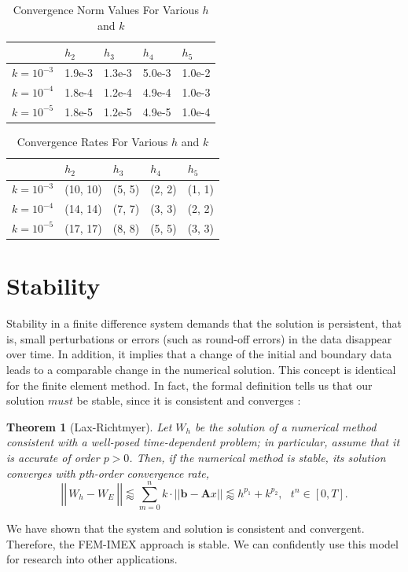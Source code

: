 \documentclass[12pt]{article}
\newtheorem{theorem}{Theorem}
\begin{document}
\begin{table}[H]
	\caption{Convergence Norm Values For Various $h$ and $k$}\label{tab:converg_norms}
	\centering
	\begin{tabular}{|l|l|l|l|l|}
		\hline
					& $h_2$  & $h_3$  & $h_4$  & $h_5$  \\ \hline
		$k=10^{-3}$ & 1.9e-3 & 1.3e-3 & 5.0e-3 & 1.0e-2 \\ \hline
		$k=10^{-4}$ & 1.8e-4 & 1.2e-4 & 4.9e-4 & 1.0e-3 \\ \hline
		$k=10^{-5}$ & 1.8e-5 & 1.2e-5 & 4.9e-5 & 1.0e-4 \\ \hline
	\end{tabular}
\end{table}


\begin{table}[H]
	\caption{Convergence Rates For Various $h$ and $k$}\label{tab:converg_rates}
	\centering
	\begin{tabular}{|l|l|l|l|l|}
		\hline
		            & $h_2$    & $h_3$  & $h_4$    & $h_5$  \\ \hline
		$k=10^{-3}$ & (10, 10) & (5, 5) & (2, 2)   & (1, 1) \\ \hline
		$k=10^{-4}$ & (14, 14) & (7, 7) & (3, 3)   & (2, 2) \\ \hline
		$k=10^{-5}$ & (17, 17) & (8, 8) & (5, 5)   & (3, 3) \\ \hline
	\end{tabular}
\end{table}


\section{Stability}

Stability in a finite difference system demands that the solution is persistent, that is, small perturbations or errors (such as round-off errors) in the data disappear over time. In addition, it implies that a change of the initial and boundary data leads to a comparable change in the numerical solution. This concept is identical for the finite element method. In fact, the formal definition tells us that our solution $must$ be stable, since it is consistent and converges \cite{MurrayII2003}:

\begin{theorem}[Lax-Richtmyer]
	Let $W_h$ be the solution of a numerical method consistent with a well-posed time-dependent problem; in particular, assume that it is accurate of order $p>0$. Then, if the numerical method is stable, its solution converges with $p$th-order convergence rate,
	$$\left|\left|\frac{}{} W_h - W_E~\right|\right| \lessapprox \sum_{m=0}^n k\cdot ||\textbf{b}-\textbf{A}x|| \lessapprox h^{p_1} + k^{p_2}, ~~~t^n\in[0,T].$$
\end{theorem}

We have shown that the system and solution is consistent and convergent. Therefore, the FEM-IMEX approach is stable. We can confidently use this model for research into other applications.




\end{document}
